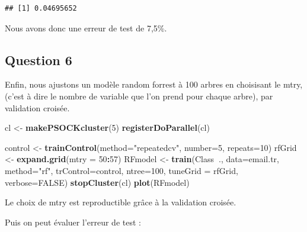 \documentclass[]{article}
\newenvironment{Shaded}{\begin{snugshade}}{\end{snugshade}}
\newcommand{\DataTypeTok}[1]{\textcolor[rgb]{0.13,0.29,0.53}{#1}}
\newcommand{\DecValTok}[1]{\textcolor[rgb]{0.00,0.00,0.81}{#1}}
\newcommand{\KeywordTok}[1]{\textcolor[rgb]{0.13,0.29,0.53}{\textbf{#1}}}
\newcommand{\NormalTok}[1]{#1}
\newcommand{\OperatorTok}[1]{\textcolor[rgb]{0.81,0.36,0.00}{\textbf{#1}}}
\newcommand{\OtherTok}[1]{\textcolor[rgb]{0.56,0.35,0.01}{#1}}
\newcommand{\StringTok}[1]{\textcolor[rgb]{0.31,0.60,0.02}{#1}}
\begin{document}
\begin{verbatim}
## [1] 0.04695652
\end{verbatim}

Nous avons donc une erreur de test de 7,5\%.

\hypertarget{question-6}{%
\subsection{Question 6}\label{question-6}}

Enfin, nous ajustons un modèle random forrest à 100 arbres en choisisant
le mtry, (c'est à dire le nombre de variable que l'on prend pour chaque
arbre), par validation croisée.

\begin{Shaded}
\begin{Highlighting}[]
\NormalTok{cl <-}\StringTok{ }\KeywordTok{makePSOCKcluster}\NormalTok{(}\DecValTok{5}\NormalTok{)}
\KeywordTok{registerDoParallel}\NormalTok{(cl)}

\NormalTok{control <-}\StringTok{ }\KeywordTok{trainControl}\NormalTok{(}\DataTypeTok{method=}\StringTok{"repeatedcv"}\NormalTok{, }\DataTypeTok{number=}\DecValTok{5}\NormalTok{, }\DataTypeTok{repeats=}\DecValTok{10}\NormalTok{)}
\NormalTok{rfGrid <-}\StringTok{  }\KeywordTok{expand.grid}\NormalTok{(}\DataTypeTok{mtry =} \DecValTok{50}\OperatorTok{:}\DecValTok{57}\NormalTok{)}
\NormalTok{RFmodel <-}\StringTok{ }\KeywordTok{train}\NormalTok{(Class}\OperatorTok{~}\NormalTok{., }\DataTypeTok{data=}\NormalTok{email.tr, }\DataTypeTok{method=}\StringTok{"rf"}\NormalTok{, }
                 \DataTypeTok{trControl=}\NormalTok{control,}
                 \DataTypeTok{ntree=}\DecValTok{100}\NormalTok{, }
                 \DataTypeTok{tuneGrid =}\NormalTok{ rfGrid,}
                 \DataTypeTok{verbose=}\OtherTok{FALSE}\NormalTok{)}
\KeywordTok{stopCluster}\NormalTok{(cl)}
\KeywordTok{plot}\NormalTok{(RFmodel)}
\end{Highlighting}
\end{Shaded}

Le choix de mtry est reproductible grâce à la validation croisée.

Puis on peut évaluer l'erreur de test :

\begin{Shaded}
\end{Shaded}
\end{document}
